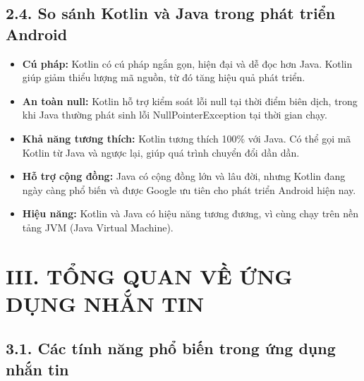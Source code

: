 \documentclass[12pt,a4paper]{article}
\begin{document}
	\vspace{0.7cm}
	
	\subsection*{2.4. So sánh Kotlin và Java trong phát triển Android}
	\vspace{0.1cm}
	
	\begin{itemize}
		\item \textbf{Cú pháp:} Kotlin có cú pháp ngắn gọn, hiện đại và dễ đọc hơn Java. Kotlin giúp giảm thiểu lượng mã nguồn, từ đó tăng hiệu quả phát triển.
		\item \textbf{An toàn null:} Kotlin hỗ trợ kiểm soát lỗi null tại thời điểm biên dịch, trong khi Java thường phát sinh lỗi NullPointerException tại thời gian chạy.
		\item \textbf{Khả năng tương thích:} Kotlin tương thích 100\% với Java. Có thể gọi mã Kotlin từ Java và ngược lại, giúp quá trình chuyển đổi dần dần.
		\item \textbf{Hỗ trợ cộng đồng:} Java có cộng đồng lớn và lâu đời, nhưng Kotlin đang ngày càng phổ biến và được Google ưu tiên cho phát triển Android hiện nay.
		\item \textbf{Hiệu năng:} Kotlin và Java có hiệu năng tương đương, vì cùng chạy trên nền tảng JVM (Java Virtual Machine).
	\end{itemize}
	\vspace{0.5cm}
	
	\section*{III. TỔNG QUAN VỀ ỨNG DỤNG NHẮN TIN}
	\vspace{0.5cm}
	
	\subsection*{3.1. Các tính năng phổ biến trong ứng dụng nhắn tin}
	\vspace{0.1cm}
	
\end{document}
